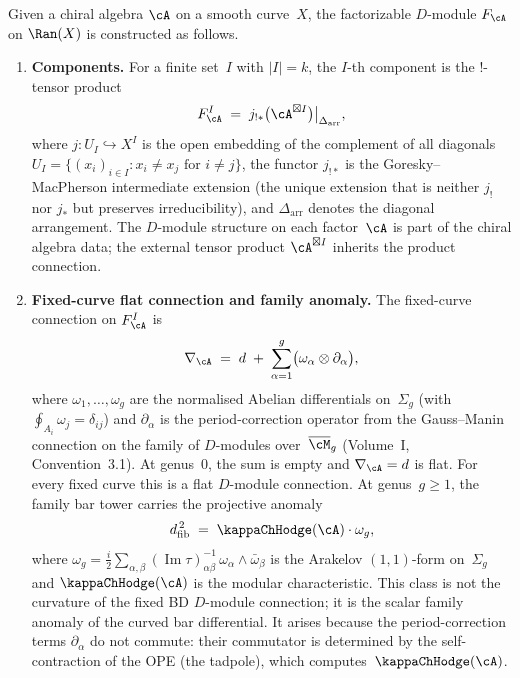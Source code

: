 \begin{construction}
\label{constr:fact-dmod-from-chiral}
Given a chiral algebra $\cA$ on a smooth curve~$X$, the
factorizable $D$-module $F_\cA$ on $\Ran(X)$ is constructed as follows.
\begin{enumerate}[label=\textup{(\roman*)}]
\item \textbf{Components.} For a finite set~$I$ with $|I| = k$, the
 $I$\nobreakdash-th component is the $!$-tensor product
 \begin{equation}\label{eq:!-tensor-component}
 F_\cA^I
 \;=\;
 j_{!*}\bigl(\cA^{\boxtimes I}\bigr)
 \big|_{\Delta_{\mathrm{arr}}},
 \end{equation}
 where $j\colon U_I \hookrightarrow X^I$ is the open embedding of
 the complement of all diagonals
 $U_I = \{(x_i)_{i \in I} : x_i \neq x_j \text{ for } i \neq j\}$,
 the functor $j_{!*}$ is the Goresky--MacPherson intermediate extension
 (the unique extension that is neither $j_!$ nor $j_*$ but preserves
 irreducibility), and $\Delta_{\mathrm{arr}}$ denotes the diagonal
 arrangement. The $D$-module structure on each factor~$\cA$ is
 part of the chiral algebra data; the external tensor product
 $\cA^{\boxtimes I}$ inherits the product connection.

\item \textbf{Fixed-curve flat connection and family anomaly.}
 The fixed-curve connection on $F_\cA^I$ is
 \begin{equation}\label{eq:fact-connection}
 \nabla_\cA
 \;=\;
 d \;+\;
 \sum_{\alpha=1}^g
 \bigl(\omega_\alpha \otimes \partial_\alpha\bigr),
 \end{equation}
 where $\omega_1,\ldots,\omega_g$ are the normalised Abelian
 differentials on~$\Sigma_g$ (with $\oint_{A_i}\omega_j = \delta_{ij}$)
 and $\partial_\alpha$ is the period-correction operator from the
 Gauss--Manin connection on the family of $D$-modules over~$\Mbar_g$
 (Volume~I, Convention~3.1). At genus~$0$, the sum is empty and
 $\nabla_\cA = d$ is flat. For every fixed curve this is a flat
 $D$-module connection. At genus~$g \geq 1$, the family bar tower
 carries the projective anomaly
 \begin{equation}\label{eq:connection-curvature}
 \dfib^{\,2}
 \;=\;
 \kappaChHodge(\cA) \cdot \omega_g,
 \end{equation}
 where $\omega_g = \frac{i}{2}\sum_{\alpha,\beta}
 (\operatorname{Im}\tau)^{-1}_{\alpha\beta}\,
 \omega_\alpha \wedge \bar\omega_\beta$ is the Arakelov
 $(1,1)$-form on~$\Sigma_g$ and $\kappaChHodge(\cA)$ is the modular
 characteristic. This class is not the curvature of the fixed
 BD $D$-module connection; it is the scalar family anomaly of the
 curved bar differential. It arises because the
 period-correction terms $\partial_\alpha$ do not commute:
 their commutator is determined by the self-contraction of the
 OPE (the tadpole), which computes~$\kappaChHodge(\cA)$.


\end{enumerate}
\end{construction}
